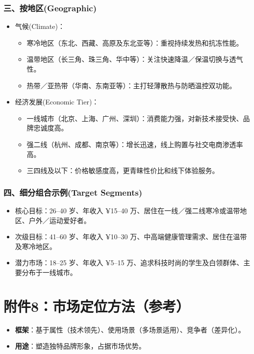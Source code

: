 \documentclass[UTF8]{report}
\theoremstyle{MyLineTheoremStyle} %
\theoremstyle{MyBlockTheoremStyle} %
\theoremstyle{MySubsubsectionStyle} %
\begin{document}
  \subsubsection{三、按地区(Geographic)}  
    \begin{itemize}
      \item 气候(Climate)：  
        \begin{itemize}
          \item 寒冷地区（东北、西藏、高原及东北亚等）：重视持续发热和抗冻性能。  
          \item 温带地区（长三角、珠三角、华中等）：关注快速降温／保温切换与透气性。  
          \item 热带／亚热带（华南、东南亚等）：主打轻薄散热与防晒温控双功能。  
        \end{itemize}
      \item 经济发展(Economic Tier)：  
        \begin{itemize}
          \item 一线城市（北京、上海、广州、深圳）：消费能力强，对新技术接受快、品牌忠诚度高。  
          \item 强二线（杭州、成都、南京等）：增长迅速，线上购置与社交电商渗透率高。  
          \item 三四线及以下：价格敏感度高，更青睐性价比和线下体验服务。  
        \end{itemize}
    \end{itemize}

  \subsubsection{四、细分组合示例(Target Segments)}  
    \begin{itemize}
      \item 核心目标：26–40 岁、年收入 ¥15–40 万、居住在一线／强二线寒冷或温带地区、户外／运动爱好者。  
      \item 次级目标：41–60 岁、年收入 ¥10–30 万、中高端健康管理需求、居住在温带及寒冷地区。  
      \item 潜力市场：18–25 岁、年收入 ¥5–15 万、追求科技时尚的学生及白领群体、主要分布于一线城市。  
    \end{itemize}

\section{附件8：市场定位方法（参考）}
\begin{itemize}
    \item \textbf{框架}：基于属性（技术领先）、使用场景（多场景适用）、竞争者（差异化）。
    \item \textbf{用途}：塑造独特品牌形象，占据市场优势。
\end{itemize}
\end{document}
